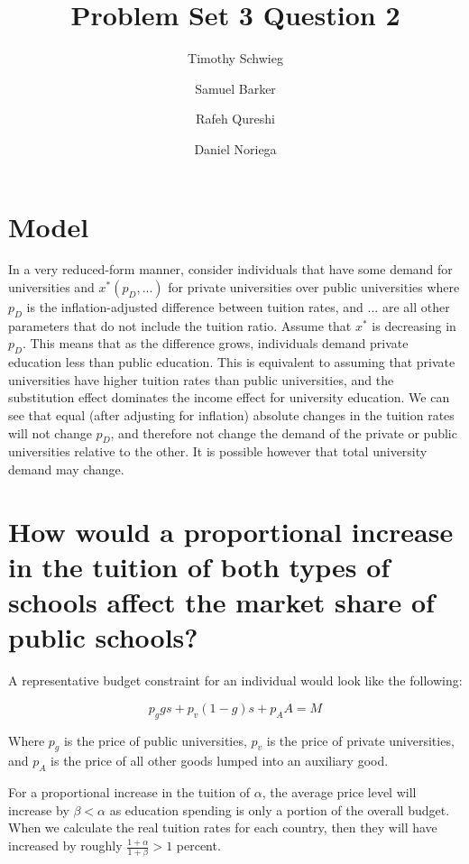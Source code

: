 \documentclass[12pt]{paper}
\title{ Problem Set 3 Question 2}
\author{ Timothy Schwieg \and Samuel Barker \and Rafeh Qureshi \and Daniel Noriega}
\begin{document}
\maketitle

\section*{Model}

In a very reduced-form manner, consider individuals that have some
demand for universities and $x^{*}( p_D, ... )$ for private
universities over public universities where $p_D$ is the
inflation-adjusted difference between tuition rates, and $...$ are all
other parameters that do not include the tuition ratio. Assume that
$x^{*}$ is decreasing in $p_D$. This means that as the difference
grows, individuals demand private education less than public
education. This is equivalent to assuming that private universities
have higher tuition rates than public universities, and the
substitution effect dominates the income effect for university
education. We can see that equal (after adjusting for inflation) absolute
changes in the tuition rates will not change $p_D$, and therefore not
change the demand of the private or public universities relative to the other. It is
possible however that total university demand may change.

\section{How would a proportional increase in the tuition of both
  types of schools affect the market share of public schools?}

A representative budget constraint for an individual would look like the following:

\begin{equation*}
  p_g g s + p_v (1-g) s + p_A A = M
\end{equation*}

Where $p_g$ is the price of public universities, $p_v$ is the price of
private universities, and $p_A$ is the price of all other goods lumped
into an auxiliary good.

For a proportional increase in the tuition of $\alpha$, the average price
level will increase by $\beta < \alpha$ as education spending is only a
portion of the overall budget. When we calculate the real tuition
rates for each country, then they will have increased by roughly
$\frac{1+\alpha}{1+\beta} > 1$ percent. 
\end{document}
